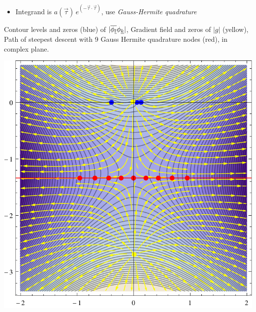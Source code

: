 \documentclass[b0paper,portrait,fontscale=0.24]{baposter}
\begin{document}
\begin{poster}
{\begin{minipage}[t]{\linewidth}
\begin{minipage}[t]{0.57\linewidth}
\begin{itemize}
        \item Integrand is $a(\vec{\tau})\,e^{(-\vec{\tau}\cdot \vec{\tau})}$,
          use \emph{Gauss-Hermite quadrature}
        \end{itemize}
        Contour levels and zeros (blue) of $|\overline{\phi_{\underline{l}}} \phi_{\underline{k}}|$,
        Gradient field and zeros of $|g|$ (yellow),
        Path of steepest descent with 9 Gauss Hermite quadrature nodes (red),
        in complex plane.
      \end{minipage}
      \hfill
      \begin{minipage}[t]{0.42\linewidth}
        \vspace{-0.3cm}
        \begin{center}
          \includegraphics[width=\textwidth,height=\textwidth]{stationary_point_example.pdf}
        \end{center}
      \end{minipage}
    \end{minipage}
  }



\end{poster}
\end{document}
